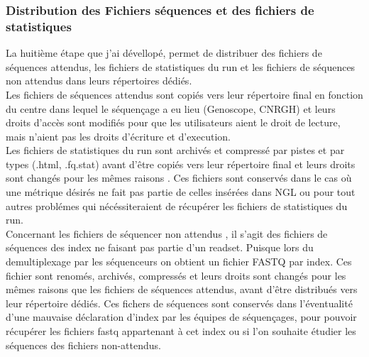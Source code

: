 \subsubsection*{Distribution des Fichiers séquences et des fichiers de statistiques}
La huitième étape que j'ai dévellopé, permet de distribuer des fichiers de séquences \og attendus\fg{}, les fichiers de statistiques du run et les fichiers de séquences \og non attendus\fg{} dans leurs répertoires dédiés.\\

Les fichiers de séquences \og attendus\fg{} sont copiés vers leur répertoire final en fonction du centre dans lequel le séquençage a eu lieu (Genoscope, CNRGH) et leurs droits d'accès sont modifiés pour que les utilisateurs aient le droit de lecture, mais n'aient pas les droits d'écriture et d'execution.\\

Les fichiers de statistiques du run sont archivés et compressé par pistes et par types (.html, .fq.stat) avant d'être copiés vers leur répertoire final et leurs droits sont changés pour les mêmes raisons .
Ces fichiers sont conservés dans le cas où une métrique désirés ne fait pas partie de celles insérées dans NGL ou pour tout autres problémes qui nécéssiteraient de récupérer les fichiers de statistiques du run.\\

Concernant les fichiers de séquencer \og non attendus \fg{}, il s'agit des fichiers de séquences des index ne faisant pas partie d'un readset. Puisque lors du demultiplexage par les séquenceurs on obtient un fichier FASTQ par index.
Ces fichier sont renomés, archivés, compressés et leurs droits sont changés pour les mêmes raisons que les fichiers de séquences \og attendus\fg{}, avant d'être distribués vers leur répertoire dédiés.
Ces fichers de séquences sont conservés dans l'éventualité d'une mauvaise déclaration d'index par les équipes de séquençages, pour pouvoir récupérer les fichiers fastq appartenant à cet index ou si l'on souhaite étudier les séquences des fichiers \og non-attendus\fg{}.\\

